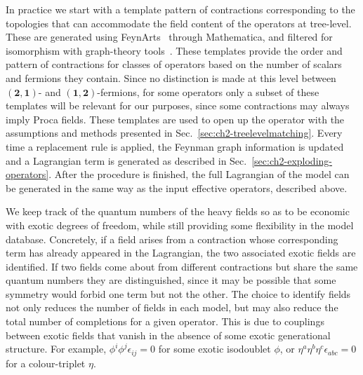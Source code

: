 In practice we start with a template pattern of contractions corresponding to
the topologies that can accommodate the field content of the operators at
tree-level. These are generated using \textsf{FeynArts}~\cite{Hahn:2000kx}
through \textsf{Mathematica}, and filtered for isomorphism with graph-theory
tools~\cite{igraph2006, the_igraph_core_team_2020_3774399,
  szabolcs_horvat_2020_3739056, SciPyProceedings_11}. These templates provide
the order and pattern of contractions for classes of operators based on the
number of scalars and fermions they contain. Since no distinction is made at
this level between $(\mathbf{2}, \mathbf{1})$- and
$(\mathbf{1}, \mathbf{2})$-fermions, for some operators only a subset of these
templates will be relevant for our purposes, since some contractions may always
imply Proca fields. These templates are used to open up the operator with the
assumptions and methods presented in Sec.~\ref{sec:ch2-treelevelmatching}. Every
time a replacement rule is applied, the Feynman graph information is updated and
a Lagrangian term is generated as described in
Sec.~\ref{sec:ch2-exploding-operators}. After the procedure is finished, the full
Lagrangian of the model can be generated in the same way as the input effective
operators, described above.

We keep track of the quantum numbers of the heavy fields so as to be economic
with exotic degrees of freedom, while still providing some flexibility in the
model database. Concretely, if a field arises from a contraction whose
corresponding term has already appeared in the Lagrangian, the two associated
exotic fields are identified. If two fields come about from different
contractions but share the same quantum numbers they are distinguished, since it
may be possible that some symmetry would forbid one term but not the other. The
choice to identify fields not only reduces the number of fields in each model,
but may also reduce the total number of completions for a given operator. This
is due to couplings between exotic fields that vanish in the absence of some
exotic generational structure. For example,
$\phi^{i} \phi^{j} \epsilon_{ij} = 0$ for some exotic isodoublet $\phi$, or
$\eta^{a} \eta^{b} \eta^{c} \epsilon_{abc} = 0$ for a colour-triplet $\eta$.

